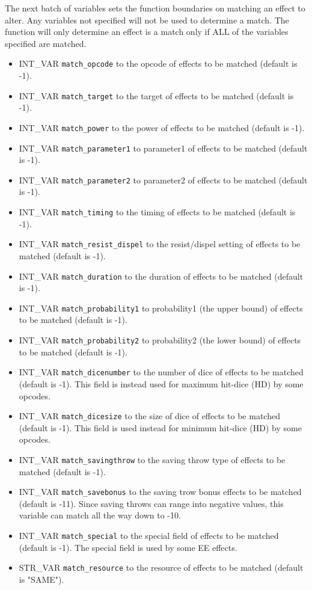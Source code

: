 \documentclass{article}
\begin{document}
The next batch of variables sets the function boundaries on matching an effect to alter. Any variables not specified will not be used to determine a match. The function will only determine an effect is a match only if ALL of the variables specified are matched.

\begin{itemize}
\item INT_VAR \verb+match_opcode+ to the opcode of effects to be matched (default is -1).
\item INT_VAR \verb+match_target+ to the target of effects to be matched (default is -1).
\item INT_VAR \verb+match_power+ to the power of effects to be matched (default is -1).
\item INT_VAR \verb+match_parameter1+ to parameter1 of effects to be matched (default is -1).
\item INT_VAR \verb+match_parameter2+ to parameter2 of effects to be matched (default is -1).
\item INT_VAR \verb+match_timing+ to the timing of effects to be matched (default is -1).
\item INT_VAR \verb+match_resist_dispel+ to the resist/dispel setting of effects to be matched (default is -1).
\item INT_VAR \verb+match_duration+ to the duration of effects to be matched (default is -1).
\item INT_VAR \verb+match_probability1+ to probability1 (the upper bound) of effects to be matched (default is -1).
\item INT_VAR \verb+match_probability2+ to probability2 (the lower bound) of effects to be matched (default is -1).
\item INT_VAR \verb+match_dicenumber+ to the number of dice of effects to be matched (default is -1). This field is instead used for maximum hit-dice (HD) by some opcodes.
\item INT_VAR \verb+match_dicesize+ to the size of dice of effects to be matched (default is -1). This field is used instead for minimum hit-dice (HD) by some opcodes.
\item INT_VAR \verb+match_savingthrow+ to the saving throw type of effects to be matched (default is -1).
\item INT_VAR \verb+match_savebonus+ to the saving trow bonus effects to be matched (default is -11). Since saving throws can range into negative values, this variable can match all the way down to -10.
\item INT_VAR \verb+match_special+ to the special field of effects to be matched (default is -1). The special field is used by some EE effects.
\item STR_VAR \verb+match_resource+ to the resource of effects to be matched (default is "SAME").
\end{itemize}
\end{document}
